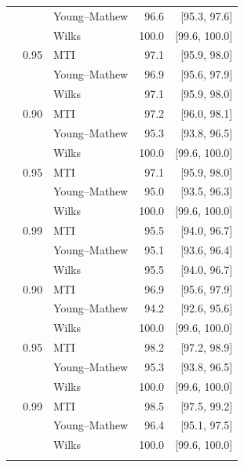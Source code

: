 \begin{longtable}{@{}rrlrr@{}}
 &  & Young--Mathew & 96.6 & [95.3, 97.6] \\
 &  & Wilks & 100.0 & [99.6, 100.0] \\
\addlinespace[0.2em]
100 & 0.95 & MTI & 97.1 & [95.9, 98.0] \\
 &  & Young--Mathew & 96.9 & [95.6, 97.9] \\
 &  & Wilks & 97.1 & [95.9, 98.0] \\
\addlinespace[0.2em]
500 & 0.90 & MTI & 97.2 & [96.0, 98.1] \\
 &  & Young--Mathew & 95.3 & [93.8, 96.5] \\
 &  & Wilks & 100.0 & [99.6, 100.0] \\
\addlinespace[0.2em]
500 & 0.95 & MTI & 97.1 & [95.9, 98.0] \\
 &  & Young--Mathew & 95.0 & [93.5, 96.3] \\
 &  & Wilks & 100.0 & [99.6, 100.0] \\
\addlinespace[0.2em]
500 & 0.99 & MTI & 95.5 & [94.0, 96.7] \\
 &  & Young--Mathew & 95.1 & [93.6, 96.4] \\
 &  & Wilks & 95.5 & [94.0, 96.7] \\
\addlinespace[0.2em]
1000 & 0.90 & MTI & 96.9 & [95.6, 97.9] \\
 &  & Young--Mathew & 94.2 & [92.6, 95.6] \\
 &  & Wilks & 100.0 & [99.6, 100.0] \\
\addlinespace[0.2em]
1000 & 0.95 & MTI & 98.2 & [97.2, 98.9] \\
 &  & Young--Mathew & 95.3 & [93.8, 96.5] \\
 &  & Wilks & 100.0 & [99.6, 100.0] \\
\addlinespace[0.2em]
1000 & 0.99 & MTI & 98.5 & [97.5, 99.2] \\
 &  & Young--Mathew & 96.4 & [95.1, 97.5] \\
 &  & Wilks & 100.0 & [99.6, 100.0] \\
\addlinespace[0.2em]
\bottomrule
\end{longtable}
\endgroup
